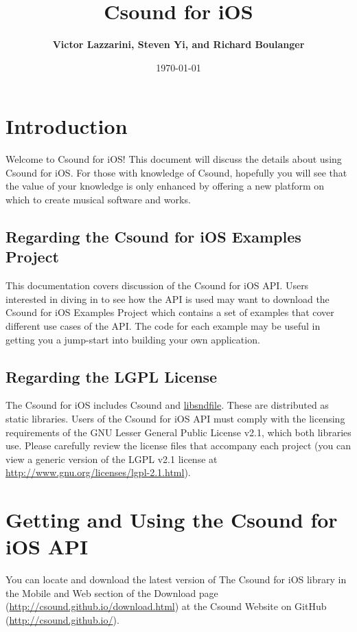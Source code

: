 \documentclass[11pt]{article}
\author{\textbf{Victor Lazzarini, Steven Yi, and Richard Boulanger}}
\date{\today}
\title{\textbf{Csound for iOS}}
\begin{document}
\maketitle

\section{Introduction}

Welcome to Csound for iOS! This document will discuss the details about using Csound for iOS. For those with knowledge of Csound, hopefully you will see that the value of your knowledge is only enhanced by offering a new platform on which to create musical software and works.

\subsection{Regarding the Csound for iOS Examples Project}

This documentation covers discussion of the Csound for iOS API.  Users interested in diving in to see how the API is used may want to download the Csound for iOS Examples Project which contains a set of examples that cover different use cases of the API. The code for each example may be useful in getting you a jump-start into building your own application.

\subsection{Regarding the LGPL License}

The Csound for iOS includes Csound and \href{http://mega-nerd.com/libsndfile/}{libsndfile}. These are distributed as static libraries. Users of the Csound for iOS API must comply with the licensing requirements of the GNU Lesser General Public License v2.1, which both libraries use. Please carefully review the license files that accompany each project (you can view a generic version of the LGPL v2.1 license at \href{http://www.gnu.org/licenses/lgpl-2.1.html}{http://www.gnu.org/licenses/lgpl-2.1.html}).


\section{Getting and Using the Csound for iOS API}

You can locate and download the latest version of The Csound for iOS library in the Mobile and Web section of the Download page (\url{http://csound.github.io/download.html}) at the Csound Website on GitHub (\url{http://csound.github.io/}). 
\end{document}

